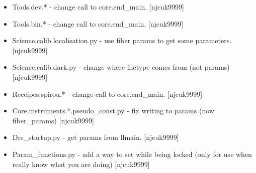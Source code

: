 \documentclass[a4paper,10pt,english]{report}
\begin{document}
\begin{itemize}
\item {} 
Tools.dev.* - change call to core.end\_main. {[}njcuk9999{]}

\item {} 
Tools.bin.* - change call to core.end\_main. {[}njcuk9999{]}

\item {} 
Science.calib.localisation.py - use fiber params to get some
parameters. {[}njcuk9999{]}

\item {} 
Science.calib.dark.py - change where filetype comes from (not params)
{[}njcuk9999{]}

\item {} 
Receipes.spirou.* - change call to core.end\_main. {[}njcuk9999{]}

\item {} 
Core.instruments.*.pseudo\_const.py - fix writing to params (now
fiber\_params) {[}njcuk9999{]}

\item {} 
Drs\_startup.py - get params from llmain. {[}njcuk9999{]}

\item {} 
Param\_functions.py - add a way to set while being locked (only for use
when really know what you are doing) {[}njcuk9999{]}

\end{itemize}
\end{document}
